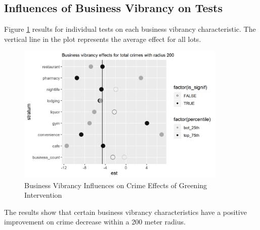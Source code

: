 \documentclass{article}
\begin{document}
\subsection{Influences of Business Vibrancy on Tests}
Figure \ref{fig:figure13} results for individual tests on each business vibrancy characteristic. The vertical line in the plot represents the average effect for all lots.
\begin{figure}[h]
    \includegraphics[width=10cm]{imgs/business_use_stratum_total_200.png}
    \centering
    \caption{Business Vibrancy Influences on Crime Effects of Greening Intervention}
    \label{fig:figure13}
\end{figure}
The results show that certain business vibrancy characteristics have a positive improvement on crime decrease within a 200 meter radius.
\end{document}
